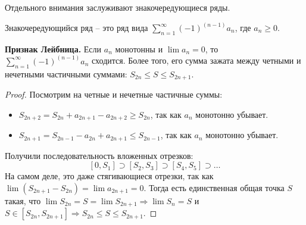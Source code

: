 \vspace{8mm}

Отдельного внимания заслуживают знакочередующиеся ряды.
\begin{conj}
    Знакочередующийся ряд -- это ряд вида $\sum\limits_{n=1}^\infty (-1)^{(n-1)}a_n$, где $a_n \geqslant 0$.
\end{conj}

\textbf{Признак Лейбница.} Если $a_n$ монотонны и $\lim a_n = 0$, то $\sum\limits_{n=1}^\infty (-1)^{(n-1)}a_n$ сходится.
Более того, его сумма зажата между четными и нечетными частичными суммами: $S_{2n} \leqslant S \leqslant S_{2n + 1}$.

\begin{proof}
    Посмотрим на четные и нечетные частичные суммы: \begin{itemize}
        \item $S_{2n + 2} = S_{2n} + a_{2n + 1} - a_{2n + 2} \geqslant  S_{2n}$, так как $a_n$ монотонно убывает.
        \item $S_{2n + 1} = S_{2n - 1} - a_{2n} + a_{2n + 1} \leqslant S_{2n - 1}$, так как $a_n$ монотонно убывает.
    \end{itemize}
    \quad Получили последовательность вложенных отрезков: \[ [0, S_1] \supset [S_2, S_3] \supset [S_4, S_5] \supset \dots \]
    \quad На самом деле, это даже стягивающиеся отрезки, так как $\lim (S_{2n+1} - S_{2n}) = \lim a_{2n+1} = 0$.
    Тогда есть единственная общая точка $S$ такая, что $\lim S_{2n} = S = \lim S_{2n+1} \Rightarrow \lim S_n = S$ и $S \in [S_{2n}, S_{2n+1}] \Rightarrow S_{2n} \leqslant S \leqslant S_{2n+1}$.
\end{proof}

